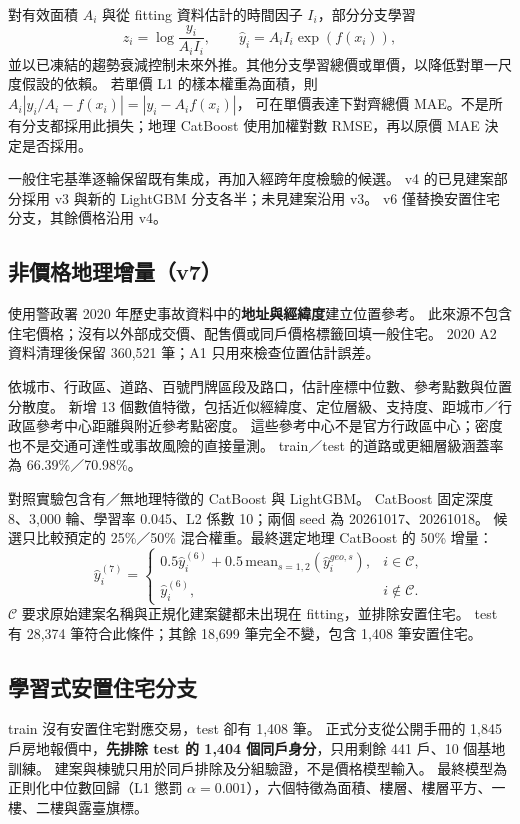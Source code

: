 \documentclass[11pt,a4paper]{article}
\begin{document}
對有效面積 \(A_i\) 與從 fitting 資料估計的時間因子 \(I_i\)，部分分支學習
\begin{equation}
z_i=\log\frac{y_i}{A_i I_i},\qquad
\hat y_i=A_i I_i\exp(f(x_i)),
\end{equation}
並以已凍結的趨勢衰減控制未來外推。其他分支學習總價或單價，以降低對單一尺度假設的依賴。
若單價 L1 的樣本權重為面積，則
\(A_i|y_i/A_i-f(x_i)|=|y_i-A_i f(x_i)|\)，
可在單價表達下對齊總價 MAE。不是所有分支都採用此損失；地理 CatBoost 使用加權對數 RMSE，再以原價 MAE 決定是否採用。

一般住宅基準逐輪保留既有集成，再加入經跨年度檢驗的候選。
v4 的已見建案部分採用 v3 與新的 LightGBM 分支各半；未見建案沿用 v3。
v6 僅替換安置住宅分支，其餘價格沿用 v4。

\subsection{非價格地理增量（v7）}
使用警政署 2020 年歷史事故資料中的\textbf{地址與經緯度}建立位置參考\cite{npa}。
此來源不包含住宅價格；沒有以外部成交價、配售價或同戶價格標籤回填一般住宅。
2020 A2 資料清理後保留 360,521 筆；A1 只用來檢查位置估計誤差。

依城市、行政區、道路、百號門牌區段及路口，估計座標中位數、參考點數與位置分散度。
新增 13 個數值特徵，包括近似經緯度、定位層級、支持度、距城市／行政區參考中心距離與附近參考點密度。
這些參考中心不是官方行政區中心；密度也不是交通可達性或事故風險的直接量測。
train／test 的道路或更細層級涵蓋率為 66.39\%／70.98\%。

對照實驗包含有／無地理特徵的 CatBoost 與 LightGBM。
CatBoost 固定深度 8、3,000 輪、學習率 0.045、L2 係數 10；兩個 seed 為 20261017、20261018。
候選只比較預定的 25\%／50\% 混合權重。最終選定地理 CatBoost 的 50\% 增量：
\begin{equation}
\hat y^{(7)}_i=
\begin{cases}
0.5\hat y^{(6)}_i+0.5\,\mathrm{mean}_{s=1,2}(\hat y^{geo,s}_i), & i\in\mathcal C,\\
\hat y^{(6)}_i,&i\notin\mathcal C.
\end{cases}
\end{equation}
\(\mathcal C\) 要求原始建案名稱與正規化建案鍵都未出現在 fitting，並排除安置住宅。
test 有 28,374 筆符合此條件；其餘 18,699 筆完全不變，包含 1,408 筆安置住宅。

\subsection{學習式安置住宅分支}
train 沒有安置住宅對應交易，test 卻有 1,408 筆。
正式分支從公開手冊的 1,845 戶房地報價中，\textbf{先排除 test 的 1,404 個同戶身分}，只用剩餘 441 戶、10 個基地訓練。
建案與棟號只用於同戶排除及分組驗證，不是價格模型輸入。
最終模型為正則化中位數回歸（L1 懲罰 \(\alpha=0.001\)），六個特徵為面積、樓層、樓層平方、一樓、二樓與露臺旗標。
\end{document}
